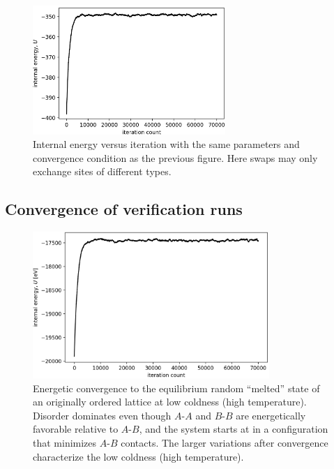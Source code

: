 \documentclass[10pt]{article}
\begin{document}
\begin{figure}[h!]
\centering
\includegraphics[width=0.65\textwidth]{Figures/swap_A_B_only_convergence.png}
\caption{Internal energy versus iteration with the same parameters and convergence condition as the previous figure.
Here swaps may only exchange sites of different types.}
\label{fig:swap_different}
\end{figure}


\clearpage
\subsection{Convergence of verification runs}

\begin{figure}[h!]
\centering
\includegraphics[width=0.80\textwidth]{Figures/verification_melted_convergence.png}
\caption{Energetic convergence to the equilibrium random ``melted'' state of an originally ordered lattice at low coldness (high temperature).
Disorder dominates even though $A$-$A$ and $B$-$B$ are energetically favorable relative to $A$-$B$, and the system starts at in a configuration that minimizes $A$-$B$ contacts.
The larger variations after convergence characterize the low coldness (high temperature).}
\label{fig:melted_convergence}
\end{figure}
\end{document}
